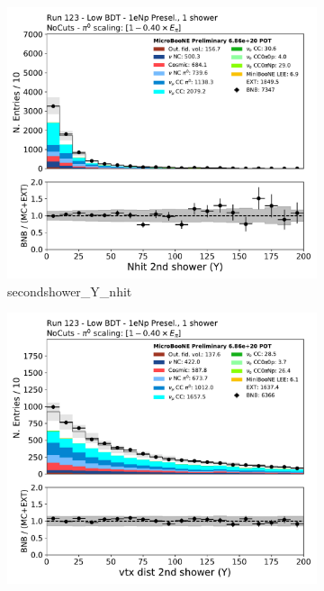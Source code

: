 \begin{figure}[H]
    \centering
    \begin{subfigure}{0.3\textwidth}
    \includegraphics[width=1.0\textwidth]{Sidebands/Figures/1eNp/LPID_NPOneShr_None_pi0e40/secondshower_Y_nhit.pdf}
    \caption{secondshower\_Y\_nhit}
    \end{subfigure}
    \begin{subfigure}{0.3\textwidth}
    \includegraphics[width=1.0\textwidth]{Sidebands/Figures/1eNp/LPID_NPOneShr_None_pi0e40/secondshower_Y_vtxdist.pdf}

\end{subfigure}
\end{figure}
